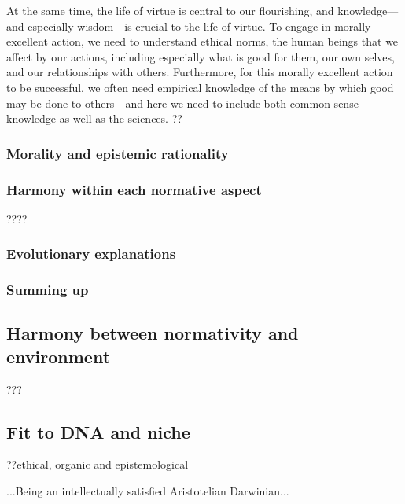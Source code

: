 At the same time, the life of virtue is central to our flourishing, and knowledge---and especially wisdom---is 
crucial to the life of virtue. To engage in morally excellent action, we need to understand ethical norms, the 
human beings that we affect by our actions, including especially what is good for them, our own selves, and our 
relationships with others. Furthermore, for this morally excellent action to be successful, we often need empirical
knowledge of the means by which good may be done to others---and here we need to include both common-sense knowledge 
as well as the sciences.
??

\subsubsection{Morality and epistemic rationality}
\subsubsection{Harmony within each normative aspect}
????
\subsubsection{Evolutionary explanations}
\subsubsection{Summing up}

\subsection{Harmony between normativity and environment}
???

\subsection{Fit to DNA and niche}
??ethical, organic and epistemological

...Being an intellectually satisfied Aristotelian Darwinian...

